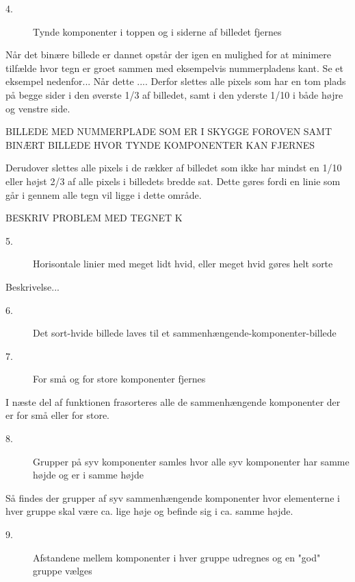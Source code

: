 \begin{description}
\item[4.] Tynde komponenter i toppen og i siderne af billedet fjernes
\end{description}

Når det binære billede er dannet opstår der igen en mulighed for at minimere tilfælde hvor tegn er groet sammen med eksempelvis nummerpladens kant. Se et eksempel nedenfor... Når dette .... Derfor slettes alle pixels som har en tom plads på begge sider i den øverste 1/3 af billedet, samt i den yderste 1/10 i både højre og venstre side.

BILLEDE MED NUMMERPLADE SOM ER I SKYGGE FOROVEN SAMT BINÆRT BILLEDE HVOR TYNDE KOMPONENTER KAN FJERNES

Derudover slettes alle pixels i de rækker af billedet som ikke har mindst en 1/10 eller højst 2/3 af alle pixels i billedets bredde sat. Dette gøres fordi en linie som går i gennem alle tegn vil ligge i dette område.

BESKRIV PROBLEM MED TEGNET K

\begin{description}
\item[5.] Horisontale linier med meget lidt hvid, eller meget hvid gøres helt sorte
\end{description}

Beskrivelse...

\begin{description}
\item[6.] Det sort-hvide billede laves til et sammenhængende-komponenter-billede
\item[7.] For små og for store komponenter fjernes
\end{description}

I næste del af funktionen frasorteres alle de sammenhængende komponenter der er for små eller for store.

\begin{description}
\item[8.] Grupper på syv komponenter samles hvor alle syv komponenter har samme højde og er i samme højde
\end{description}

Så findes der grupper af syv sammenhængende komponenter hvor elementerne i hver gruppe skal være ca. lige høje og befinde sig i ca. samme højde.

\begin{description}
\item[9.] Afstandene mellem komponenter i hver gruppe udregnes og en "god" gruppe vælges
\end{description}

